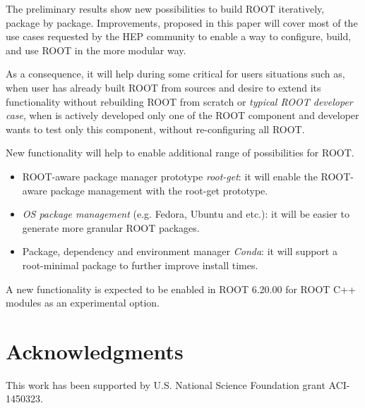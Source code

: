 \documentclass[12pt]{iopart}
\begin{document}
The preliminary results show new possibilities to build ROOT iteratively, package by package. Improvements, proposed in this paper will cover most of the use cases requested by the HEP community to enable a way to configure, build, and use ROOT in the more modular way.

As a consequence, it will help during some critical for users situations such as, when user has already built ROOT from sources and desire to extend its functionality without rebuilding ROOT from scratch or \textit{typical ROOT developer case}, when is actively developed only one of the ROOT component and developer wants to test only this component, without re-configuring all ROOT.

New functionality will help to enable additional range of possibilities for ROOT.
\begin{itemize}
    \item ROOT-aware package manager prototype \textit{root-get}: it will enable the ROOT-aware package management with the root-get prototype. \cite{pm}
    \item \textit{OS package management} (e.g. Fedora, Ubuntu and etc.): it will be easier to generate more granular ROOT packages.
    \item Package, dependency and environment manager \textit{Conda}: it will support a root-minimal package to further improve install times. 
\end{itemize}

A new functionality is expected to be enabled in ROOT 6.20.00 for ROOT C++ modules \cite{cxxmodules} as an experimental option.

\section{Acknowledgments}

This work has been supported by U.S. National Science Foundation grant ACI-1450323.
\end{document}
